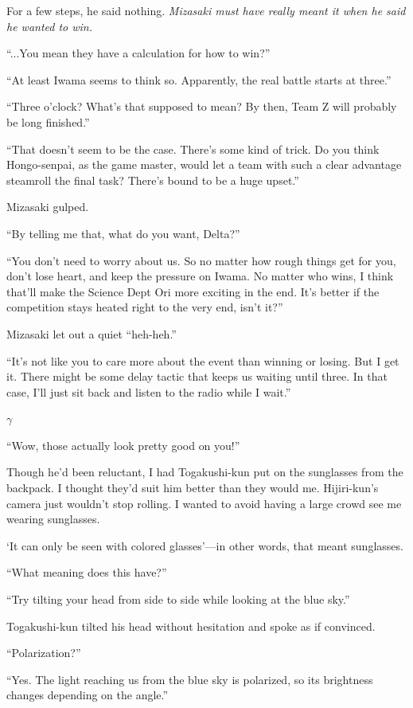 \documentclass[
    a4paper,
    12pt,
    twoside,
    openany,
    UTF8,
    fontset=windows
]{ctexbook}
\begin{document}
For a few steps, he said nothing. \textit{Mizasaki must have really meant it when he said he wanted to win.}

``...You mean they have a calculation for how to win?''

``At least Iwama seems to think so. Apparently, the real battle starts at three.''

``Three o'clock? What's that supposed to mean? By then, Team Z will probably be long finished.''

``That doesn't seem to be the case. There's some kind of trick. Do you think Hongo-senpai, as the game master, would let a team with such a clear advantage steamroll the final task? There's bound to be a huge upset.''

Mizasaki gulped.

``By telling me that, what do you want, Delta?''

``You don't need to worry about us. So no matter how rough things get for you, don't lose heart, and keep the pressure on Iwama. No matter who wins, I think that'll make the Science Dept Ori more exciting in the end. It's better if the competition stays heated right to the very end, isn't it?''

Mizasaki let out a quiet ``heh-heh.''

``It's not like you to care more about the event than winning or losing. But I get it. There might be some delay tactic that keeps us waiting until three. In that case, I'll just sit back and listen to the radio while I wait.''

$\gamma$

``Wow, those actually look pretty good on you!''

Though he'd been reluctant, I had Togakushi-kun put on the sunglasses from the backpack. I thought they'd suit him better than they would me. Hijiri-kun's camera just wouldn't stop rolling. I wanted to avoid having a large crowd see me wearing sunglasses.

`It can only be seen with colored glasses'---in other words, that meant sunglasses.

``What meaning does this have?''

``Try tilting your head from side to side while looking at the blue sky.''

Togakushi-kun tilted his head without hesitation and spoke as if convinced.

``Polarization?''

``Yes. The light reaching us from the blue sky is polarized, so its brightness changes depending on the angle.''
\end{document}
